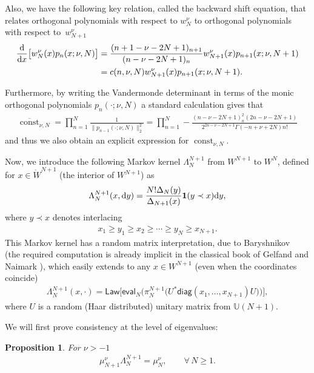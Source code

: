 \documentclass[pdftex]{sigma}
\numberwithin{equation}{section}
\newtheorem{Proposition}[Theorem]{Proposition}
{ \theoremstyle{definition}
\newtheorem{Definition}[Theorem]{Definition}
\newtheorem{Remark}[Theorem]{Remark} }
\begin{document}
Also, we have the following key relation, called the backward shift equation, that relates orthogonal polynomials with respect to $w_N^{\nu}$ to orthogonal polynomials with respect to~$w_{N+1}^\nu$
\begin{align*}
\frac{{\rm d}}{{\rm d}x}\big[w_N^{\nu}(x)p_n(x;\nu,N)\big]&=\frac{(n+1-\nu-2N+1)_{n+1}}{(n-\nu-2N+1)_n}w_{N+1}^{\nu}(x)p_{n+1}(x;\nu, N+1)\nonumber\\
&=c(n,\nu,N)w_{N+1}^{\nu}(x)p_{n+1}(x;\nu, N+1).
\end{align*}

Furthermore, by writing the Vandermonde determinant in terms of the monic orthogonal polynomials $p_n(\cdot; \nu, N)$ a standard calculation gives that{\samepage
\begin{gather*}
\overline{\operatorname{const}}_{\nu, N}=\prod_{n=1}^{N}\frac{1}{\|p_{n-1}(\cdot;\nu,N)\|_2^2}=\prod_{n=1}^{N}-\frac{(n-\nu-2N+1)_n^2(2n-\nu-2N+1)}{2^{2n-\nu-2N+1}\Gamma(-n+\nu+2N)n!}
\end{gather*}
and thus we also obtain an explicit expression for $\operatorname{const}_{\nu, N}$.}

Now, we introduce the following Markov kernel $\Lambda_N^{N+1}$ from $W^{N+1}$ to $W^N$, defined for \mbox{$x \in \mathring{W}^{N+1}$} (the interior of $W^{N+1}$) as
\begin{gather*}
\Lambda_N^{N+1}(x,{\rm d}y)=\frac{N!\Delta_N(y)}{\Delta_{N+1}(x)}\textbf{1}(y\prec x){\rm d}y,
\end{gather*}
where $y\prec x$ denotes interlacing
\begin{gather*}
x_1 \ge y_1 \ge x_2 \ge \cdots \ge y_N \ge x_{N+1}.
\end{gather*}
This Markov kernel has a random matrix interpretation, due to Baryshnikov~\cite{Baryshnikov} (the required computation is already implicit in the classical book of Gelfand and Naimark \cite{GelfandNaimark}), which easily extends to any $x\in W^{N+1}$ (even when the coordinates coincide)
\begin{gather*}
\Lambda_N^{N+1}(x,\cdot)=\mathsf{Law} \big[\mathsf{eval}_N \big(\pi_N^{N+1}\big(U^*\mathsf{diag}(x_1,\dots, x_{N+1})U\big)\big)\big],
\end{gather*}
where $U$ is a random (Haar distributed) unitary matrix from $\mathbb{U}(N+1)$.

We will first prove consistency at the level of eigenvalues:

\begin{Proposition}\label{eigenvalueconsistency}
For $\nu>-1$
\begin{gather*}
\mu_{N+1}^{\nu} \Lambda_N^{N+1}=\mu_N^{\nu}, \qquad \forall\, N\ge 1.
\end{gather*}
\end{Proposition}
\end{document}
